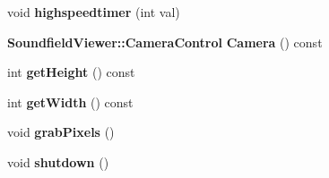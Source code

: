 \begin{DoxyCompactItemize}
\item 
void {\bfseries highspeedtimer} (int val)\label{classSoundfieldViewer_1_1RenderEngine_a993a1f3e2ed602cadcba2a0f6a663d55}

\item 
{\bf Soundfield\-Viewer\-::\-Camera\-Control} {\bfseries Camera} () const \label{classSoundfieldViewer_1_1RenderEngine_ad38d29abb5fe55a1be61c96a408bd454}

\item 
int {\bfseries get\-Height} () const \label{classSoundfieldViewer_1_1RenderEngine_aa42975d380063c52e64c0df25bf23471}

\item 
int {\bfseries get\-Width} () const \label{classSoundfieldViewer_1_1RenderEngine_afce973f1d7215885553ded0fc2109860}

\item 
void {\bfseries grab\-Pixels} ()\label{classSoundfieldViewer_1_1RenderEngine_afca0c8e03f1bf7601dd8ab735e1e2615}

\item 
void {\bfseries shutdown} ()\label{classSoundfieldViewer_1_1RenderEngine_a9064817a0d261b1f6fbf90b003587b55}

\end{DoxyCompactItemize}
